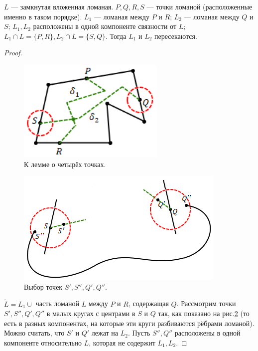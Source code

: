 \begin{lemma}
    $L$ — замкнутая вложенная ломаная. $P, Q, R, S$ — точки ломаной (расположенные именно в таком порядке). $L_1$ — ломаная между $P$ и $R$; $L_2$ — ломаная между $Q$ и $S$; $L_1, L_2$ расположены в одной компоненте связности от $L$; $L_1 \cap L = \{P,R\}, L_2 \cap L = \{S,Q\}$. Тогда $L_1$ и $L_2$ пересекаются.
\end{lemma}
\begin{proof}
    \begin{figure}[htbp]
        \centering
        \includegraphics[scale=1]{images/c5.4.png}
        \caption{К лемме о четырёх точках.}
        \label{fig:c5.4}
    \end{figure}

    \begin{figure}[htbp]
        \centering
        \includegraphics[scale=1]{images/c5.5.png}
        \caption{Выбор точек $S', S'', Q', Q''$.}
        \label{fig:c5.5}
    \end{figure}

    $\tilde{L} = L_1 \cup$ часть ломаной $L$ между $P$ и $R$, содержащая $Q$.
    Рассмотрим точки $S', S'', Q', Q''$ в малых кругах с центрами в $S$ и $Q$ так, как показано на рис.\ref{fig:c5.5} (то есть в разных компонентах, на которые эти круги разбиваются рёбрами ломаной).
    Можно считать, что $S'$ и $Q'$ лежат на $L_2$. Пусть $S'', Q''$ расположены в одной компоненте относительно $L$, которая не содержит $L_1, L_2$.


\end{proof}
